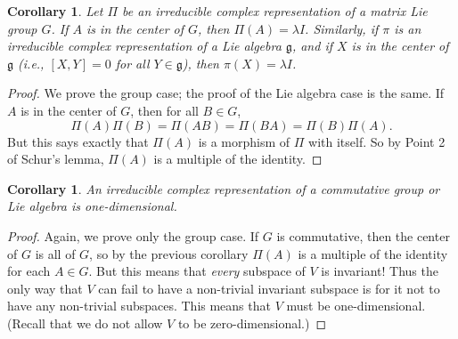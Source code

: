 \documentclass[12pt]{amsbook}
\let \frak = \mathfrak
\theoremstyle{plain}
\newtheorem{corollary}[theorem]{Corollary}
\numberwithin{equation}{chapter}
\numberwithin{theorem}{chapter}
\begin{document}
\begin{corollary}
\label{schur.center}Let $\Pi$ be an irreducible complex representation of a
matrix Lie group $G$. If $A$ is in the center of $G$, then $\Pi(A)=\lambda I$.
Similarly, if $\pi$ is an irreducible complex representation of a Lie algebra
$\frak{g}$, and if $X$ is in the center of $\frak{g}$ (i.e., $[X,Y]=0$ for all
$Y\in\frak{g}$), then $\pi(X)=\lambda I$.
\end{corollary}

\begin{proof}
We prove the group case; the proof of the Lie algebra case is the same. If $A$
is in the center of $G$, then for all $B\in G$,
\[
\Pi(A)\Pi(B)=\Pi(AB)=\Pi(BA)=\Pi(B)\Pi(A)\text{.}%
\]
But this says exactly that $\Pi(A)$ is a morphism of $\Pi$ with itself. So by
Point 2 of Schur's lemma, $\Pi(A)$ is a multiple of the identity.
\end{proof}

\begin{corollary}
\label{schur.commute}An irreducible complex representation of a
\textit{commutative} group or Lie algebra is one-dimensional.
\end{corollary}

\begin{proof}
Again, we prove only the group case. If $G$ is commutative, then the center of
$G$ is all of $G$, so by the previous corollary $\Pi(A)$ is a multiple of the
identity for each $A\in G$. But this means that \textit{every} subspace of $V$
is invariant! Thus the only way that $V$ can fail to have a non-trivial
invariant subspace is for it not to have any non-trivial subspaces. This means
that $V$ must be one-dimensional. (Recall that we do not allow $V$ to be zero-dimensional.)
\end{proof}
\end{document}
